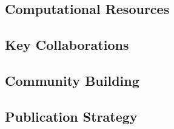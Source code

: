 \documentclass[11pt,a4paper]{article}
\begin{document}
    \subsection{Computational Resources}
    
    
    \subsection{Key Collaborations}
    
    
    
    
    \subsection{Community Building}
    
    
    
    \subsection{Publication Strategy}
    
\end{document}
